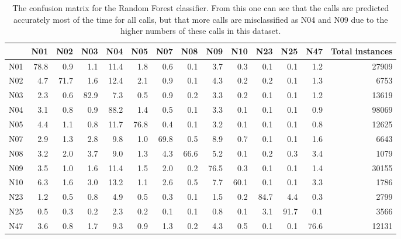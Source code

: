 \begin{table}
\small
\begin{tabular}{|l|r|r|r|r|r|r|r|r|r|r|r|r|r|}
\hline
      &    N01  &   N02  &    N03  &    N04  &   N05  &   N07  &  N08  &    N09  &   N10  &   N23  &   N25  &   N47  & Total instances\\
\hline
 N01  &  78.8   &   0.9   &   1.1  &  11.4   &  1.8   &   0.6  &   0.1  &  3.7   &   0.3  &  0.1   &   0.1  &  1.2   & 27909  \\
 N02  &   4.7   &  71.7   &   1.6  &  12.4   &  2.1   &   0.9  &   0.1 &   4.3   &   0.2  &  0.2   &   0.1  &  1.3   & 6753   \\
 N03  &   2.3   &   0.6   &  82.9  &   7.3   &  0.5   &   0.9  &   0.2 &   3.3   &   0.2  &  0.1   &   0.1  &  1.2   & 13619  \\
 N04  &   3.1   &   0.8   &   0.9  &  88.2   &  1.4   &   0.5  &   0.1 &   3.3   &   0.1  &  0.1   &   0.1  &  0.9   & 98069  \\
 N05  &   4.4   &   1.1   &   0.8  &  11.7   & 76.8   &   0.4  &   0.1 &   3.2   &   0.1  &  0.1   &   0.1  &  0.8   & 12625  \\
 N07  &   2.9   &   1.3   &   2.8  &   9.8   &  1.0   &  69.8  &   0.5 &   8.9   &   0.7  &  0.1   &   0.1  &  1.6   & 6643   \\
 N08  &   3.2   &   2.0   &   3.7  &   9.0   &  1.3   &   4.3  &  66.6 &   5.2   &   0.1  &  0.2   &   0.3  &  3.4   & 1079   \\
 N09  &   3.5   &   1.0   &   1.6  &  11.4   &  1.5   &   2.0  &   0.2 &  76.5   &   0.3  &  0.1   &   0.1  &  1.4   & 30155  \\
 N10  &   6.3   &   1.6   &   3.0  &  13.2   &  1.1   &   2.6  &   0.5 &   7.7   &  60.1  &  0.1   &   0.1  &  3.3   & 1786   \\
 N23  &   1.2   &   0.5   &   0.8  &   4.9   &  0.5   &   0.3  &   0.1 &   1.5   &   0.2  & 84.7   &   4.4  &  0.3   & 2799   \\
 N25  &   0.5   &   0.3   &   0.2  &   2.3   &  0.2   &   0.1  &   0.1 &   0.8   &   0.1  &  3.1   &  91.7  &  0.1   & 3566   \\
 N47  &   3.6   &   0.8   &   1.7  &   9.3   &  0.9   &   1.3  &   0.2 &   4.3   &   0.5  &  0.1   &   0.1  & 76.6   & 12131  \\
\hline
\end{tabular}
\caption{The confusion matrix for the Random Forest classifier.
  From this one can see that the calls are predicted accurately most
  of the time for all calls, but that more calls are misclassified as
  N04 and N09 due to the higher numbers of these calls in this
  dataset. }
\label{table:CallConfusionMatrix}
\normalsize
\end{table}


